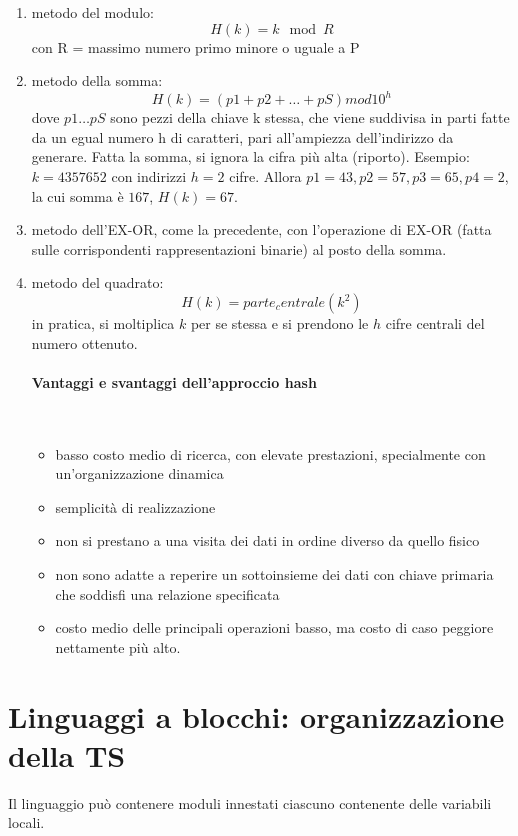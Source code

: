\documentclass[12pt]{report}
\begin{document}
	\begin{enumerate}
		\item metodo del modulo:
		\[
		H(k) = k \mod R
		\]
		con R = massimo numero primo minore o uguale a P
		\item metodo della somma:
		\[
		H(k) = (p1 + p2 + \dots + pS) mod 10^h
		\]
		dove $p1\dots pS$ sono pezzi della chiave k stessa, che viene suddivisa in parti fatte da un egual numero h di caratteri, pari all'ampiezza dell'indirizzo da generare. Fatta la somma, si ignora la cifra più alta (riporto). Esempio: $k=4357652$ con indirizzi $h=2$ cifre. Allora $p1=43, p2=57, p3=65, p4=2$, la cui somma è $167$, $H(k)=67$. \\
		\item metodo dell'EX-OR, come la precedente, con l'operazione di EX-OR (fatta sulle corrispondenti rappresentazioni binarie) al posto della somma.
		\item metodo del quadrato:
		\[
		H(k) = parte_centrale(k^2)
		\]
		in pratica, si moltiplica $k$ per se stessa e si prendono le $h$ cifre centrali del numero ottenuto. \\
		\paragraph{Vantaggi e svantaggi dell'approccio hash} \quad \\
		\begin{itemize}
			\item basso costo medio di ricerca, con elevate prestazioni, specialmente con un'organizzazione dinamica
			\item semplicità di realizzazione
			\item non si prestano a una visita dei dati in ordine diverso da quello fisico
			\item non sono adatte a reperire un sottoinsieme dei dati con chiave primaria che soddisfi una relazione specificata
			\item costo medio delle principali operazioni basso, ma costo di caso peggiore nettamente più alto.
		\end{itemize}
	\end{enumerate}
	\section{Linguaggi a blocchi: organizzazione della TS}
	Il linguaggio può contenere moduli innestati ciascuno contenente delle variabili locali. \\
\end{document}
